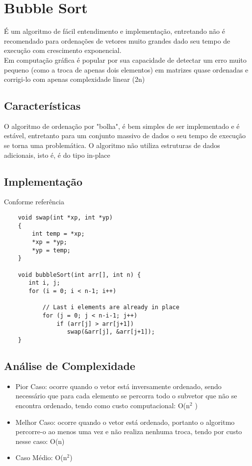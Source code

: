 \documentclass[12pt]{article}
\begin{document}
\section{Bubble Sort}
É um algoritmo de fácil entendimento e implementação, entretando não é recomendado para ordenações de vetores muito grandes dado seu tempo de execução com crescimento exponencial.\\
Em computação gráfica é popular por sua capacidade de detectar um erro muito pequeno (como a troca de apenas dois elementos) em matrizes quase ordenadas e corrigi-lo com apenas complexidade linear (2n) \cite{bubbleSort}
\subsection{Características}
O algoritmo de ordenação por "bolha", é bem simples de ser implementado e é estável, entretanto para um conjunto massivo de dados o seu tempo de execução se torna uma problemática. O algoritmo não utiliza estruturas de dados adicionais, isto é, é do tipo in-place
\subsection{Implementação}
    Conforme referência \cite{bubbleSort}
    \begin{lstlisting}
    void swap(int *xp, int *yp)  
    {  
        int temp = *xp;  
        *xp = *yp;  
        *yp = temp;  
    }  
    
    void bubbleSort(int arr[], int n) { 
       int i, j; 
       for (i = 0; i < n-1; i++)       
      
           // Last i elements are already in place    
           for (j = 0; j < n-i-1; j++)  
               if (arr[j] > arr[j+1]) 
                  swap(&arr[j], &arr[j+1]); 
    } 
    \end{lstlisting}
\subsection{Análise de Complexidade}
    \begin{itemize}
        \item Pior Caso: ocorre quando o vetor está inversamente ordenado, sendo necessário que para cada elemento se percorra todo o subvetor que não se encontra ordenado, tendo como custo computacional: O(n$^{2}$ )
        \item Melhor Caso: ocorre quando o vetor está ordenado, portanto o algoritmo percorre-o ao menos uma vez e não realiza nenhuma troca, tendo por custo nesse caso: O(n)
        \item Caso Médio: O(n$^2$)
    \end{itemize}
\end{document}
